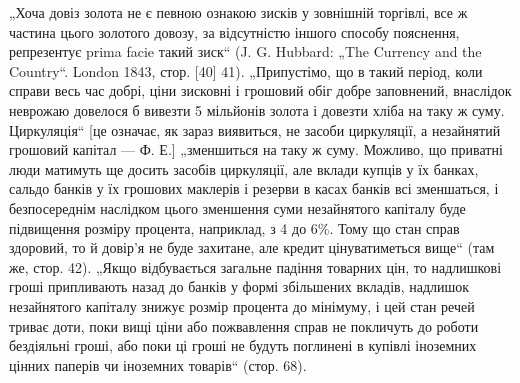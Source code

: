 „Хоча довіз золота не є певною ознакою зисків у зовнішній
торгівлі, все ж частина цього золотого довозу, за відсутністю
іншого способу пояснення, репрезентує prima facie такий зиск“
(J. G. Hubbard: „The Currency and the Country“. London 1843,
стор. [40] 41). „Припустімо, що в такий період, коли справи
весь час добрі, ціни зисковні і грошовий обіг добре заповнений,
внаслідок неврожаю довелося б вивезти 5 мільйонів
золота і довезти хліба на таку ж суму. Циркуляція“ [це означає, як зараз виявиться, не засоби
циркуляції, а незайнятий грошовий капітал — Ф. Е.] „зменшиться на таку ж суму. Можливо, що приватні
люди матимуть ще досить засобів циркуляції,
але вклади купців у їх банках, сальдо банків у їх грошових маклерів і резерви в касах банків всі
зменшаться, і безпосереднім
наслідком цього зменшення суми незайнятого капіталу буде підвищення розміру процента, наприклад, з 4
до 6\%. Тому що стан
справ здоровий, то й довір’я не буде захитане, але кредит цінуватиметься вище“ (там же, стор. 42).
„Якщо відбувається загальне
падіння товарних цін, то надлишкові гроші припливають назад
до банків у формі збільшених вкладів, надлишок незайнятого капіталу знижує розмір процента до
мінімуму, і цей стан речей
триває доти, поки вищі ціни або пожвавлення справ не покличуть
до роботи бездіяльні гроші, або поки ці гроші не будуть поглинені в купівлі іноземних цінних паперів
чи іноземних товарів“ (стор. 68).

